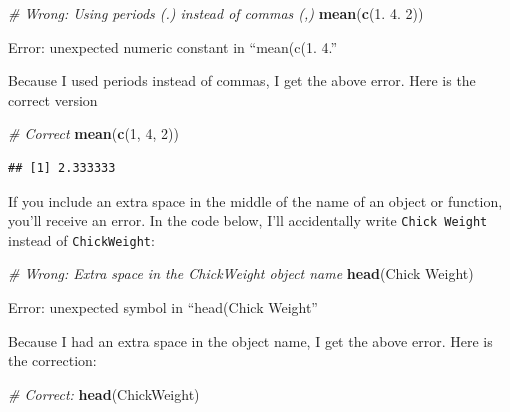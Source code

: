 \documentclass[
]{book}
\newenvironment{Shaded}{\begin{snugshade}}{\end{snugshade}}
\newcommand{\CommentTok}[1]{\textcolor[rgb]{0.56,0.35,0.01}{\textit{#1}}}
\newcommand{\DecValTok}[1]{\textcolor[rgb]{0.00,0.00,0.81}{#1}}
\newcommand{\FloatTok}[1]{\textcolor[rgb]{0.00,0.00,0.81}{#1}}
\newcommand{\KeywordTok}[1]{\textcolor[rgb]{0.13,0.29,0.53}{\textbf{#1}}}
\newcommand{\NormalTok}[1]{#1}
\begin{document}
\begin{Shaded}
\begin{Highlighting}[]
\CommentTok{# Wrong: Using periods (.) instead of commas (,)}
\KeywordTok{mean}\NormalTok{(}\KeywordTok{c}\NormalTok{(}\FloatTok{1.} \FloatTok{4.} \DecValTok{2}\NormalTok{))}
\end{Highlighting}
\end{Shaded}

\begin{error}

Error: unexpected numeric constant in ``mean(c(1. 4.''

\end{error}

Because I used periods instead of commas, I get the above error. Here is the correct version

\begin{Shaded}
\begin{Highlighting}[]
\CommentTok{# Correct}
\KeywordTok{mean}\NormalTok{(}\KeywordTok{c}\NormalTok{(}\DecValTok{1}\NormalTok{, }\DecValTok{4}\NormalTok{, }\DecValTok{2}\NormalTok{))}
\end{Highlighting}
\end{Shaded}

\begin{verbatim}
## [1] 2.333333
\end{verbatim}

If you include an extra space in the middle of the name of an object or function, you'll receive an error. In the code below, I'll accidentally write \texttt{Chick\ Weight} instead of \texttt{ChickWeight}:

\begin{Shaded}
\begin{Highlighting}[]
\CommentTok{# Wrong: Extra space in the ChickWeight object name}
\KeywordTok{head}\NormalTok{(Chick Weight)}
\end{Highlighting}
\end{Shaded}

\begin{error}

Error: unexpected symbol in ``head(Chick Weight''

\end{error}

Because I had an extra space in the object name, I get the above error. Here is the correction:

\begin{Shaded}
\begin{Highlighting}[]
\CommentTok{# Correct:}
\KeywordTok{head}\NormalTok{(ChickWeight)}
\end{Highlighting}
\end{Shaded}
\end{document}

